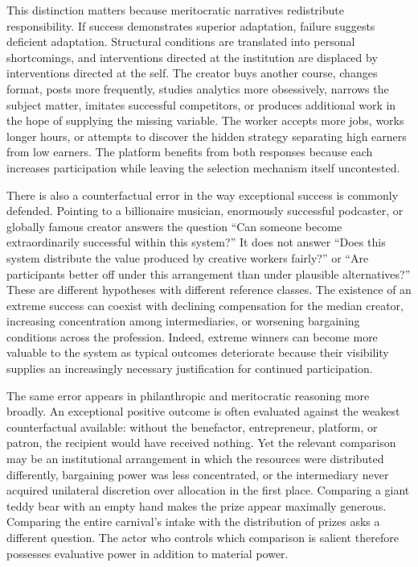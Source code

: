 \documentclass[11pt]{article}
\begin{document}
This distinction matters because meritocratic narratives redistribute responsibility. If success demonstrates superior adaptation, failure suggests deficient adaptation. Structural conditions are translated into personal shortcomings, and interventions directed at the institution are displaced by interventions directed at the self. The creator buys another course, changes format, posts more frequently, studies analytics more obsessively, narrows the subject matter, imitates successful competitors, or produces additional work in the hope of supplying the missing variable. The worker accepts more jobs, works longer hours, or attempts to discover the hidden strategy separating high earners from low earners. The platform benefits from both responses because each increases participation while leaving the selection mechanism itself uncontested.

There is also a counterfactual error in the way exceptional success is commonly defended. Pointing to a billionaire musician, enormously successful podcaster, or globally famous creator answers the question ``Can someone become extraordinarily successful within this system?'' It does not answer ``Does this system distribute the value produced by creative workers fairly?'' or ``Are participants better off under this arrangement than under plausible alternatives?'' These are different hypotheses with different reference classes. The existence of an extreme success can coexist with declining compensation for the median creator, increasing concentration among intermediaries, or worsening bargaining conditions across the profession. Indeed, extreme winners can become more valuable to the system as typical outcomes deteriorate because their visibility supplies an increasingly necessary justification for continued participation.

The same error appears in philanthropic and meritocratic reasoning more broadly. An exceptional positive outcome is often evaluated against the weakest counterfactual available: without the benefactor, entrepreneur, platform, or patron, the recipient would have received nothing. Yet the relevant comparison may be an institutional arrangement in which the resources were distributed differently, bargaining power was less concentrated, or the intermediary never acquired unilateral discretion over allocation in the first place. Comparing a giant teddy bear with an empty hand makes the prize appear maximally generous. Comparing the entire carnival's intake with the distribution of prizes asks a different question. The actor who controls which comparison is salient therefore possesses evaluative power in addition to material power.
\end{document}
